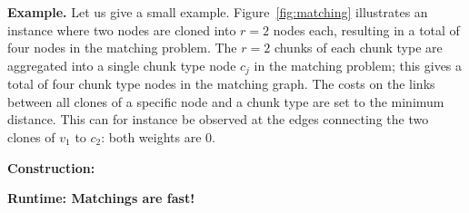 \documentclass[9pt]{sigcomm-alternate}
\newcommand{\MaFactor}{r}
\newcommand{\RedundancyFactor}{\ensuremath{r}}
\newcommand{\VmChunkAssignment}{\mu}
\newcommand{\NodeMapping}{\pi}
\newcommand{\VirtualNode}{v}
\newcommand{\achunk}{\ensuremath{c}}
\newcommand{\RS}{\textsc{RS}}
\newcommand{\MA}{\textsc{MA}}
\begin{document}
\textbf{Example.} Let us give a small example.
%
%
%
Figure~\ref{fig:matching} illustrates 
an instance where two nodes are
cloned into $\MaFactor = 2$ nodes each, resulting in a total of four nodes in
the matching problem. 
The $\RedundancyFactor = 2$ chunks of each chunk type are
aggregated into a single chunk type node $\achunk_j$  in the matching problem;
this gives a total of four chunk type nodes in the matching graph. The costs
on the links between all clones of a specific node and a chunk type are set to
the minimum distance. This can for instance be observed at the edges connecting
the two clones of $\VirtualNode_1$ to $\achunk_2$: both weights are 0.

\textbf{Construction:} 

\textbf{Runtime: Matchings are fast!}
\end{document}
